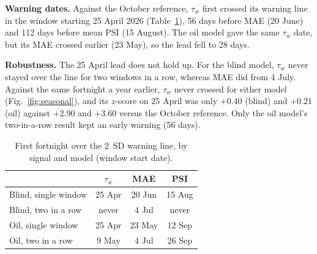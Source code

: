 
\textbf{Warning dates.} Against the October reference, $\tau_w$ first crossed
its warning line in the window starting 25 April 2026 (Table~\ref{tab:warn}),
56 days before MAE (20 June) and 112 days before mean PSI (15 August). The
oil model gave the same $\tau_w$ date, but its MAE crossed earlier (23 May),
so the lead fell to 28 days.

\textbf{Robustness.} The 25 April lead does not hold up. For the blind model,
$\tau_w$ never stayed over the line for two windows in a row, whereas MAE did
from 4 July. Against the same fortnight a year earlier, $\tau_w$ never crossed
for either model (Fig.~\ref{fig:seasonal}), and its $z$-score on 25 April was
only $+0.40$ (blind) and $+0.21$ (oil) against $+2.90$ and $+3.60$ versus
the October reference. Only the oil model's two-in-a-row result kept an early warning
(56 days).

\begin{table}[t]
  \centering
  \caption{First fortnight over the 2~SD warning line, by signal and model
  (window start date).}
  \label{tab:warn}
  \begin{tabular}{lccc}
    \hline
    & $\tau_w$ & MAE & PSI \\
    \hline
    Blind, single window & 25 Apr & 20 Jun & 15 Aug \\
    Blind, two in a row & never & 4 Jul & never \\
    Oil, single window & 25 Apr & 23 May & 12 Sep \\
    Oil, two in a row & 9 May & 4 Jul & 26 Sep \\
    \hline
  \end{tabular}
\end{table}

